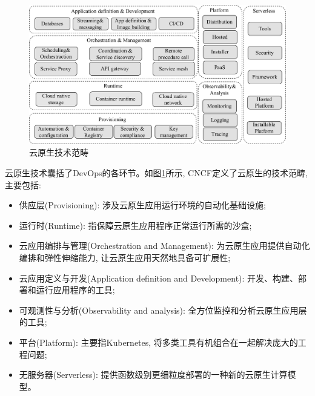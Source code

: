 \begin{figure}[h] %
    \centering %
    \includegraphics[width=1.0 \textwidth]{FIGs/chapter2/cloud_native_landscape.pdf} %
    \caption{云原生技术范畴} %
    \label{cloud_native_landscape} %
\end{figure}%

云原生技术囊括了DevOps的各环节。如图\ref{cloud_native_landscape}所示, CNCF定义了云原生的技术范畴, 主要包括: 

\begin{itemize}[itemindent=2em]
    \item 供应层(Provisioning): 涉及云原生应用运行环境的自动化基础设施;

    \item 运行时(Runtime): 指保障云原生应用程序正常运行所需的沙盒;

    \item 云应用编排与管理(Orchestration and Management): 为云原生应用提供自动化编排和弹性伸缩能力, 让云原生应用天然地具备可扩展性;

    \item 云应用定义与开发(Application definition and Development): 开发、构建、部署和运行应用程序的工具;

    \item 可观测性与分析(Observability and analysis): 全方位监控和分析云原生应用层的工具;

    \item 平台(Platform): 主要指Kubernetes, 将多类工具有机组合在一起解决庞大的工程问题;

    \item 无服务器(Serverless): 提供函数级别更细粒度部署的一种新的云原生计算模型。
\end{itemize}


